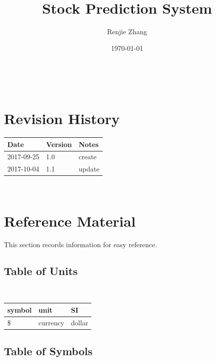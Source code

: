 \documentclass[12pt]{article}
\begin{document}
\title{Stock Prediction System} 
\author{Renjie Zhang}
\date{\today}
	
\maketitle

~\newpage


\section{Revision History}

\begin{tabularx}{\textwidth}{p{3cm}p{2cm}X}
\toprule {\bf Date} & {\bf Version} & {\bf Notes}\\
\midrule
2017-09-25  & 1.0 & create\\
2017-10-04  & 1.1 & update\\
\bottomrule
\end{tabularx}

~\newpage

\section{Reference Material}

This section records information for easy reference.

\subsection{Table of Units}

~\newline

\renewcommand{\arraystretch}{1.2}
  \noindent \begin{tabular}{l l l} 
    \toprule		
    \textbf{symbol} & \textbf{unit} & \textbf{SI}\\
    \midrule 
    \si{\$} & currency & dollar\\

    \bottomrule
  \end{tabular}


\subsection{Table of Symbols}
\end{document}
